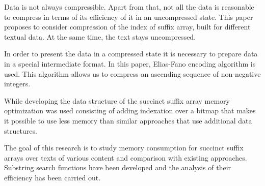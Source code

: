 Data is not always compressible. Apart from that, not all the data is reasonable to compress
in terms of its efficiency of it in an uncompressed state.
This paper proposes to consider compression of the index of suffix array,
built for different textual data. At the same time, the text stays uncompressed.

In order to present the data in a compressed state it is necessary to prepare
data in a special intermediate format.
In this paper, Elias-Fano encoding algorithm \cite{pibiri2014dynamic} is used.
This algorithm allows us to compress an ascending sequence of non-negative integers.

While developing the data structure of the succinct suffix array memory optimization was used consisting of adding indexation
over a bitmap that makes it possible to use less memory than similar approaches that use additional data structures.

The goal of this research is to study memory consumption for succinct suffix arrays over texts of various content
and comparison with existing approaches.
Substring search functions have been developed and the analysis of their efficiency has been carried out.

